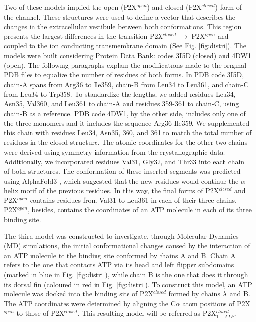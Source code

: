 \documentclass[pdflatex,sn-nature]{sn-jnl}%
\begin{document}
Two of these models implied the open (P2X$^{open}$) and closed (P2X$^{closed}$) form of the channel. These structures were used to define a vector that describes the changes in the extracellular vestibule between both conformations. This region
presents the largest differences in the transition P2X$^{closed}$ $\xrightarrow{}$ P2X$^{open}$ \cite{abierta_p2x} and coupled to the ion conducting transmembrane domain  (See Fig. \ref{fig:distri}). 
The models were built considering Protein Data Bank: codes 3I5D (closed) and 4DW1 (open). The following paragraphs explain the modifications made to the original PDB files to equalize the number of residues of both forms.
In PDB code 3I5D, chain-A spans from Arg36 to Ile359, chain-B from Leu34 to Leu361, and chain-C from Leu34 to Trp358. To standardize the lengths, we added residues Leu34, Asn35, Val360, and Leu361 to chain-A and residues 359-361 to chain-C, using chain-B as a reference. PDB code 4DW1, by the other side, includes only one of the three monomers and it includes the sequence Arg36-Ile359. We supplemented this chain with residues Leu34, Asn35, 360, and 361 to match the total number of residues in the closed structure. The atomic coordinates for the other two chains were derived using symmetry information from the crystallographic data.
Additionally, we incorporated residues Val31, Gly32, and Thr33 into each chain of both structures. The conformation of these inserted segments was predicted using AlphaFold3 \cite{af3}, which suggested that the new residues would continue the $\alpha$-helix motif of the previous residues.
In this way, the final forms of P2X$^{closed}$ and P2X$^{open}$ contains residues from Val31 to Leu361 in each of their three chains. P2X$^{open}$, besides, contains the coordinates of an ATP molecule in each of its three binding site.


The third model was constructed to investigate, through Molecular Dynamics (MD) simulations, the initial conformational changes caused by the interaction of an ATP molecule to the binding site conformed by chains A and B. Chain A refers to the one that contacts ATP via its head and left flipper subdomains (marked in blue in Fig. \ref{fig:distri}), while chain B is the one that does it through its dorsal fin (coloured in red in Fig. \ref{fig:distri}).
To construct this model, an ATP molecule was docked into the binding site of P2X$^{closed}$ formed by chains A and B. 
The ATP coordinates were determined by aligning the C$\alpha$ atom positions of P2X$^{open}$ to those of P2X$^{closed}$. This resulting model will be referred as P2X$^{closed}_{1-ATP}$. 
\end{document}
